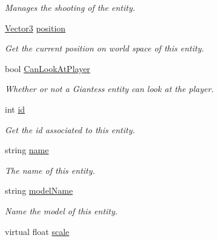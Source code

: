 \begin{DoxyCompactItemize}
\begin{DoxyCompactList}\small\item\em Manages the shooting of the entity. \end{DoxyCompactList}\item 
\mbox{\hyperlink{class_lua_1_1_vector3}{Vector3}} \mbox{\hyperlink{class_lua_1_1_entity_ad8bd97d98fddc9b89f8410512b502c3f}{position}}
\begin{DoxyCompactList}\small\item\em Get the current position on world space of this entity. \end{DoxyCompactList}\item 
bool \mbox{\hyperlink{class_lua_1_1_entity_a7dfc341caa3b11cc42ef45226689741c}{Can\+Look\+At\+Player}}
\begin{DoxyCompactList}\small\item\em Whether or not a Giantess entity can look at the player. \end{DoxyCompactList}\item 
int \mbox{\hyperlink{class_lua_1_1_entity_a7776e8422e86d2ab5670ca314a65aab5}{id}}
\begin{DoxyCompactList}\small\item\em Get the id associated to this entity. \end{DoxyCompactList}\item 
string \mbox{\hyperlink{class_lua_1_1_entity_a8155b6c6ef0f0630ec7e818dd4cdaec4}{name}}
\begin{DoxyCompactList}\small\item\em The name of this entity. \end{DoxyCompactList}\item 
string \mbox{\hyperlink{class_lua_1_1_entity_acd67b39a7c95e3cb87171073c2877de1}{model\+Name}}
\begin{DoxyCompactList}\small\item\em Name the model of this entity. \end{DoxyCompactList}\item 
virtual float \mbox{\hyperlink{class_lua_1_1_entity_a784673c0e6fbf29381a309a5df0ee10e}{scale}}

\end{DoxyCompactItemize}
